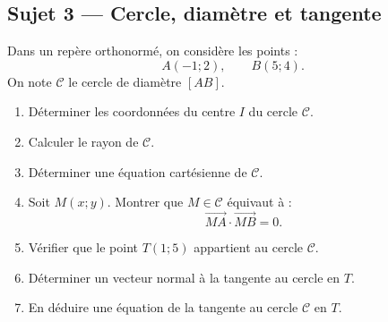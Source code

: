 \subsection*{Sujet 3 — Cercle, diamètre et tangente}

Dans un repère orthonormé, on considère les points :
\[
A(-1;2),\qquad B(5;4).
\]
On note $\mathcal C$ le cercle de diamètre $[AB]$.
\begin{enumerate}
\item Déterminer les coordonnées du centre $I$ du cercle $\mathcal C$.
\item Calculer le rayon de $\mathcal C$.
\item Déterminer une équation cartésienne de $\mathcal C$.
\item Soit $M(x;y)$. Montrer que $M\in \mathcal C$ équivaut à :
\[
\overrightarrow{MA}\cdot\overrightarrow{MB}=0.
\]
\item Vérifier que le point $T(1;5)$ appartient au cercle $\mathcal C$.
\item Déterminer un vecteur normal à la tangente au cercle en $T$.
\item En déduire une équation de la tangente au cercle $\mathcal C$ en $T$.
\end{enumerate}
